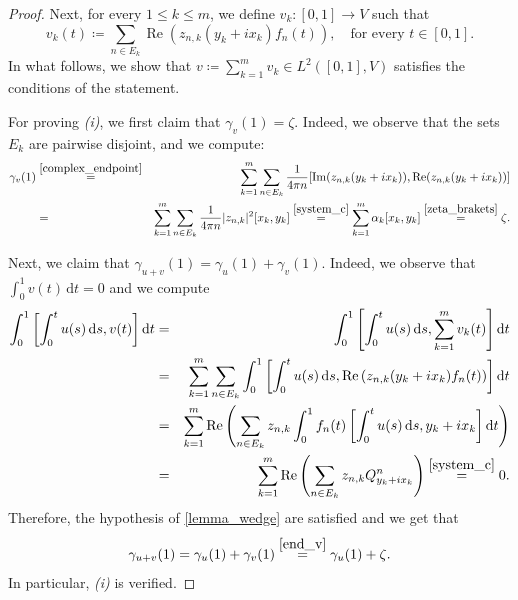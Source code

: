 \documentclass[a4paper,11pt,reqno]{amsart}
\theoremstyle{plain}
\theoremstyle{definition}
\newcommand{\re}{\operatorname{Re}}
\newcommand{\im}{\operatorname{Im}}
\newcommand{\de}{\mathrm{d}}
\newcommand{\coloneq}{\coloneqq}
\begin{document}
\begin{proof}
 Next, for every $1 \le k \le m$, we define $v_k \colon [0,1] \to V$ such that
 \begin{equation} \label{def_vk}
 v_k(t) \coloneq \sum_{n \in E_k} \re\left(z_{n,k}(y_k+ix_k)f_n(t)\right), \quad \text{for every $t \in [0,1]$.} 
 \end{equation}
 In what follows, we show that $v \coloneq \sum_{k=1}^{m} v_k \in L^2([0,1],V)$ satisfies the conditions of the statement.

For proving \emph{(i)}, we first claim that $\gamma_v(1) = \zeta$. Indeed, we observe that the sets $E_k$ are pairwise disjoint, and we compute:
 \begin{eqnarray}
 \gamma_v(1)&\stackrel{\eqref{complex_endpoint}}{=}& \sum_{k=1}^m \sum_{n \in E_k} \frac{1}{4 \pi n} [\im(z_{n,k}(y_k+ix_k)),\re(z_{n,k}(y_k+ix_k))] \notag \\
 &=& \sum_{k=1}^m \sum_{n \in E_k} \frac{1}{4 \pi n} \lvert z_{n,k}\rvert^2 [x_k,y_k] \stackrel{\eqref{system_c}}{=} \sum_{k=1}^m \alpha_k[x_k,y_k] \stackrel{\eqref{zeta_brakets}}{=} \zeta. \label{end_v}
 \end{eqnarray}

Next, we claim that $\gamma_{u+v}(1)=\gamma_u(1)+\gamma_v(1)$. Indeed, we observe that $\int^1_0 v(t) \, \de t = 0$ and we compute
\begin{eqnarray*}
 \int^1_0 \left[\int^t_0 u(s) \, \de s , v(t)\right] \de t &=& \int^1_0 \left[\int^t_0 u(s) \, \de s , \sum_{k=1}^mv_k(t)\right] \de t \\
 &=& \sum_{k=1}^m \sum_{n \in E_k} \int^1_0 \left[\int^t_0 u(s) \, \de s , \re\left(z_{n,k}(y_k+ix_k)f_n(t)\right)\right] \de t \\
 &=& \sum_{k=1}^m \re\left(\sum_{n \in E_k}z_{n,k}\int^1_0 f_n(t) \left[\int^t_0 u(s) \, \de s , y_k+ix_k \right] \de t\right) \\
 &=& \sum_{k=1}^m \re\left(\sum_{n \in E_k} z_{n,k} Q^n_{y_k + ix_k}\right) \stackrel{\eqref{system_c}}{=} 0.
\end{eqnarray*}
Therefore, the hypothesis of \cref{lemma_wedge} are satisfied and we get that 
$$\gamma_{u+v}(1)=\gamma_u(1)+\gamma_v(1)\stackrel{\eqref{end_v}}{=}\gamma_u(1)+\zeta.$$ In particular, \emph{(i)} is verified.


\end{proof}
\end{document}
